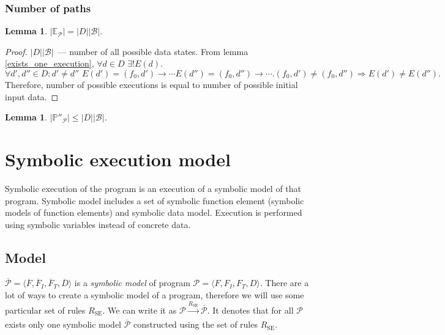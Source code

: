 \documentclass[oneside,a4paper]{article}  %
\newcommand{\level}{\section}
\newcommand{\sublevel}{\subsection}
\newcommand{\subsublevel}{\subsubsection}
\newcommand{\Ra}{\Rightarrow}
\newcommand{\ra}{\rightarrow}
\newcommand{\term}[1]{\textit{#1}\index{#1}}
\newcommand{\se}{\overline}    %
\newtheorem{lemma}[theorem]{Lemma}
\begin{document}
\subsublevel*{Number of paths}

\begin{lemma}
    $|\mathds{E}_\mathcal{P}| = |D| |\mathcal{B}|$.
\end{lemma}

\begin{proof}
    $|D| |\mathcal{B}|$~--- number of all possible data states.
    From lemma \ref{exists_one_execution},
        $\forall d \in D \,\, \exists! E(d)$.
    $\forall d', d'' \in D : d' \neq d'' \,\, E(d') = (f_0, d') \ra \cdots
        E(d'') = (f_0, d'') \ra \cdots.
        (f_0, d') \neq (f_0, d'') \Ra E(d') \neq E(d'').$
    Therefore, number of possible executions is equal to number of
    possible initial input data.
\end{proof}

\begin{lemma}
    $|\mathds{P}''_\mathcal{P}| \le |D| |\mathcal{B}|$.
\end{lemma}

\level{Symbolic execution model}

Symbolic execution of the program is
an execution of a symbolic model of that program.
Symbolic model includes a set of symbolic function element
(symbolic models of function elements) and
symbolic data model.
Execution is performed using symbolic variables instead of concrete data.

\sublevel{Model}

$\se{\mathcal{P}} = \langle \se{F}, \se{F}_I, \se{F}_T, \se{D} \rangle$
is a \term{symbolic model} of program
$\mathcal{P} = \langle F, F_I, F_T, D \rangle$.
There are a lot of ways to create a symbolic model of a program,
therefore we will use some particular set of rules $R_\text{SE}$.
We can write it as
$\mathcal{P} \xrightarrow[]{R_\text{SE}} \se{\mathcal{P}}$.
It denotes that for all $\mathcal{P}$ exists only one symbolic model
$\se{\mathcal{P}}$ constructed using the set of rules $R_\text{SE}$.
\end{document}
